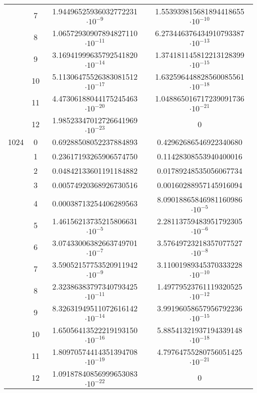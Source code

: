 \documentclass[12 pt]{article}        	%
\begin{document}
\begin{table}[H]
\begin{tabular}{lccc}
                 & 7 & 1.94496525936032772231 $\cdot 10^{-9} $ & 1.553939815681894418655 $\cdot 10^{-10}$\\
                 & 8 & 1.06572930907894827110 $\cdot 10^{-11} $ & 6.273446376434910793387 $\cdot 10^{-13}$\\
                 & 9 & 3.16941999635792541820 $\cdot 10^{-14} $ & 1.374181145812213128399 $\cdot 10^{-15}$\\
                 & 10 & 5.11306475526383081512 $\cdot 10^{-17} $ & 1.632596448828560085561 $\cdot 10^{-18}$\\
                 & 11 & 4.47306188044175245463 $\cdot 10^{-20} $ & 1.048865016717239091736 $\cdot 10^{-21}$\\
                 & 12 & 1.98523347012726641969 $\cdot 10^{-23} $ & 0\\
        \midrule 
        1024 & 0 & 0.69288508052237884893 & 0.42962686546922340680 \\
                 & 1 & 0.23617193265906574750 & 0.11428308553940400016 \\
                 & 2 & 0.04842133601191184882 & 0.01789248535056067734 \\
                 & 3 & 0.00574920368926730516 & 0.00160288957145916094 \\ 
                 & 4 & 0.00038713254406289563 & 8.09018865846981160986 $\cdot 10^{-5}$ \\
                 & 5 & 1.46156213735215806631  $\cdot 10^{-5}$ & 2.28113759483951792305 $\cdot 10^{-6}$ \\
                 & 6 & 3.07433006382663749701  $\cdot 10^{-7}$ & 3.57649723218357077527 $\cdot 10^{-8}$ \\
                 & 7 & 3.59052157753520911942  $\cdot 10^{-9}$ & 3.11001989345370333228 $\cdot 10^{-10}$ \\ 
                 & 8 & 2.32386383797340793425  $\cdot 10^{-11}$ & 1.49779523761119320525 $\cdot 10^{-12}$ \\ 
                 & 9 & 8.32631949511072616142  $\cdot 10^{-14}$ & 3.99196058657956792236 $\cdot 10^{-15}$ \\
                 & 10 & 1.65056413522219193150  $\cdot 10^{-16}$ & 5.88541321937194339148 $\cdot 10^{-18}$ \\
                 & 11 & 1.80970574414351394708  $\cdot 10^{-19}$ & 4.79764755280756051425 $\cdot 10^{-21}$ \\
                 & 12 & 1.09187840856999653083 $\cdot 10^{-22}$ & 0 \\
        \bottomrule
    \end{tabular}
\end{table}
\end{document}
